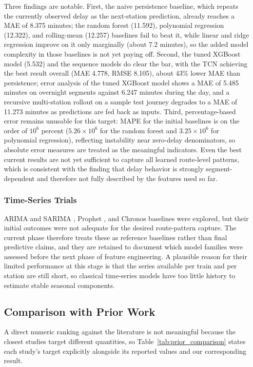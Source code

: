 \documentclass[conference]{IEEEtran}
\begin{document}
Three findings are notable. First, the naive persistence baseline, which repeats the currently observed delay as the next-station prediction, already reaches a MAE of 8.375 minutes; the random forest (11.592), polynomial regression (12.322), and rolling-mean (12.257) baselines fail to beat it, while linear and ridge regression improve on it only marginally (about 7.2 minutes), so the added model complexity in those baselines is not yet paying off. Second, the tuned XGBoost model (5.532) and the sequence models do clear the bar, with the TCN achieving the best result overall (MAE 4.778, RMSE 8.105), about 43\% lower MAE than persistence; error analysis of the tuned XGBoost model shows a MAE of 5.485 minutes on overnight segments against 6.247 minutes during the day, and a recursive multi-station rollout on a sample test journey degrades to a MAE of 11.273 minutes as predictions are fed back as inputs. Third, percentage-based error remains unusable for this target: MAPE for the initial baselines is on the order of $10^{6}$ percent ($5.26\times10^{6}$ for the random forest and $3.25\times10^{6}$ for polynomial regression), reflecting instability near zero-delay denominators, so absolute error measures are treated as the meaningful indicators. Even the best current results are not yet sufficient to capture all learned route-level patterns, which is consistent with the finding that delay behavior is strongly segment-dependent and therefore not fully described by the features used so far.

\subsubsection{Time-Series Trials}
ARIMA and SARIMA \cite{boxjenkins1976}, Prophet \cite{taylor2018forecasting}, and Chronos \cite{woo2024chronos} baselines were explored, but their initial outcomes were not adequate for the desired route-pattern capture. The current phase therefore treats these as reference baselines rather than final predictive claims, and they are retained to document which model families were assessed before the next phase of feature engineering. A plausible reason for their limited performance at this stage is that the series available per train and per station are still short, so classical time-series models have too little history to estimate stable seasonal components.

\subsection{Comparison with Prior Work}
A direct numeric ranking against the literature is not meaningful because the closest studies target different quantities, so Table~\ref{tab:prior_comparison} states each study's target explicitly alongside its reported values and our corresponding result.
\end{document}
